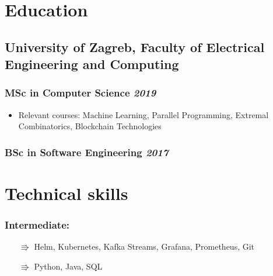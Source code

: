 \documentclass[a4paper]{article}
\newcommand{\bolditalicpair}
[2]
{\textbf{#1} \texorpdfstring{\hfill}{} \textit{#2}}
\begin{document}



\section{Education}
\subsection{\bolditalicpair{University of Zagreb, Faculty of Electrical Engineering and Computing}{}}

\subsubsection{\bolditalicpair{MSc in Computer Science}{2019}}

\begin{itemize}
  \item Relevant courses: Machine Learning, Parallel Programming, Extremal Combinatorics, Blockchain Technologies %
\end{itemize}

\subsubsection{\bolditalicpair{BSc in Software Engineering}{2017}}



\section{Technical skills}
\subsubsection{\bolditalicpair{Intermediate:}{}}

\begin{itemize}
  \item[$\Rrightarrow$] Helm, Kubernetes, Kafka Streams, Grafana, Prometheus, Git
  \item[$\Rrightarrow$] Python, Java, SQL
\end{itemize}
\end{document}
